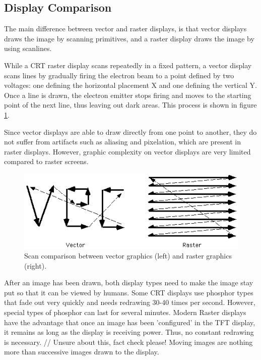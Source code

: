 \subsection{Display Comparison}
The main difference between vector and raster displays, is that vector displays draws the image by scanning primitives, and a raster display draws the image by using scanlines. 

While a CRT raster display scans repeatedly in a fixed pattern, a vector display scans lines by gradually firing the electron beam to a point defined by two voltages: one defining the horizontal placement X and one defining the vertical Y. 
Once a line is drawn, the electron emitter stops firing and moves to the starting point of the next line, thus leaving out dark areas. 
This process is shown in figure \ref{fig:vectorscan}.

Since vector displays are able to draw directly from one point to another, they do not suffer from artifacts such as aliasing and pixelation, which are present in raster displays\cite{vector-monitor}.
However, graphic complexity on vector displays are very limited compared to raster screens.

\begin{figure}[h!]
\centering \includegraphics[width=0.8\linewidth]{images/scan.png}
\caption{Scan comparison between vector graphics (left) and raster graphics (right)\cite{vecvsras}.}
\label{fig:vectorscan}
\end{figure}

After an image has been drawn, both display types need to make the image stay put so that it can be viewed by humans. 
Some CRT displays use phosphor types that fade out very quickly and needs redrawing 30-40 times per second\cite{vector-monitor}.
However, special types of phosphor can last for several minutes.
Modern Raster displays have the advantage that once an image has been 'configured' in the TFT display, it remains as long as the display is receiving power. 
Thus, no constant redrawing is necessary. // Unsure about this, fact check please!
Moving images are nothing more than successive images drawn to the display.

